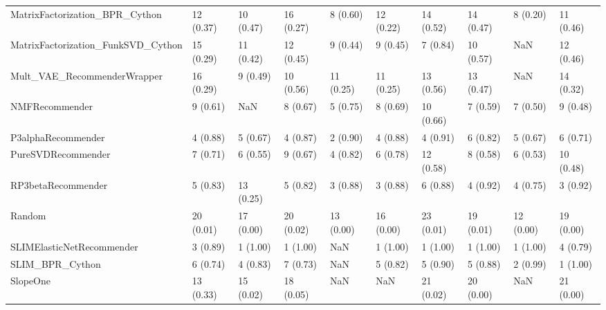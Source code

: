 \begin{tabular}{llllllllll}
     MatrixFactorization\_BPR\_Cython &                12 (0.37) &   10 (0.47) &     16 (0.27) &     8 (0.60) &            12 (0.22) &           14 (0.52) &         14 (0.47) &           8 (0.20) &         11 (0.46) \\
 MatrixFactorization\_FunkSVD\_Cython &                15 (0.29) &   11 (0.42) &     12 (0.45) &     9 (0.44) &             9 (0.45) &            7 (0.84) &         10 (0.57) &                NaN &         12 (0.46) \\
        Mult\_VAE\_RecommenderWrapper &                16 (0.29) &    9 (0.49) &     10 (0.56) &    11 (0.25) &            11 (0.25) &           13 (0.56) &         13 (0.47) &                NaN &         14 (0.32) \\
                     NMFRecommender &                 9 (0.61) &         NaN &      8 (0.67) &     5 (0.75) &             8 (0.69) &           10 (0.66) &          7 (0.59) &           7 (0.50) &          9 (0.48) \\
                 P3alphaRecommender &                 4 (0.88) &    5 (0.67) &      4 (0.87) &     2 (0.90) &             4 (0.88) &            4 (0.91) &          6 (0.82) &           5 (0.67) &          6 (0.71) \\
                 PureSVDRecommender &                 7 (0.71) &    6 (0.55) &      9 (0.67) &     4 (0.82) &             6 (0.78) &           12 (0.58) &          8 (0.58) &           6 (0.53) &         10 (0.48) \\
                 RP3betaRecommender &                 5 (0.83) &   13 (0.25) &      5 (0.82) &     3 (0.88) &             3 (0.88) &            6 (0.88) &          4 (0.92) &           4 (0.75) &          3 (0.92) \\
                             Random &                20 (0.01) &   17 (0.00) &     20 (0.02) &    13 (0.00) &            16 (0.00) &           23 (0.01) &         19 (0.01) &          12 (0.00) &         19 (0.00) \\
          SLIMElasticNetRecommender &                 3 (0.89) &    1 (1.00) &      1 (1.00) &          NaN &             1 (1.00) &            1 (1.00) &          1 (1.00) &           1 (1.00) &          4 (0.79) \\
                    SLIM\_BPR\_Cython &                 6 (0.74) &    4 (0.83) &      7 (0.73) &          NaN &             5 (0.82) &            5 (0.90) &          5 (0.88) &           2 (0.99) &          1 (1.00) \\
                           SlopeOne &                13 (0.33) &   15 (0.02) &     18 (0.05) &          NaN &                  NaN &           21 (0.02) &         20 (0.00) &                NaN &         21 (0.00) \\

\end{tabular}
